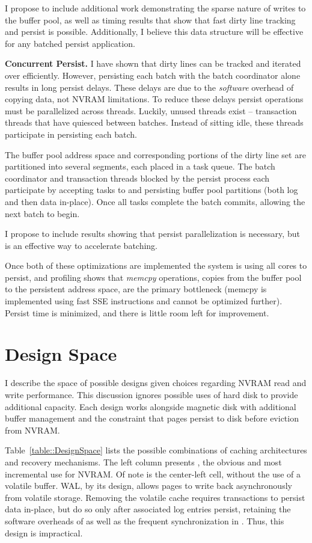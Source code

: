 I propose to include additional work demonstrating the sparse nature of writes to the buffer pool, as well as timing results that show that fast dirty line tracking and persist is possible.
Additionally, I believe this data structure will be effective for any batched persist application.

\textbf{Concurrent Persist.}
I have shown that dirty lines can be tracked and iterated over efficiently.
However, persisting each batch with the batch coordinator alone results in long persist delays.
These delays are due to the \emph{software} overhead of copying data, not NVRAM limitations.
To reduce these delays persist operations must be parallelized across threads.
Luckily, unused threads exist -- transaction threads that have quiesced between batches.
Instead of sitting idle, these threads participate in persisting each batch.

The buffer pool address space and corresponding portions of the dirty line set are partitioned into several segments, each placed in a task queue.
The batch coordinator and transaction threads blocked by the persist process each participate by accepting tasks to and persisting buffer pool partitions (both log and then data in-place).
Once all tasks complete the batch commits, allowing the next batch to begin.

I propose to include results showing that persist parallelization is necessary, but is an effective way to accelerate batching.

Once both of these optimizations are implemented the system is using all cores to persist, and profiling shows that \emph{memcpy} operations, copies from the buffer pool to the persistent address space, are the primary bottleneck (memcpy is implemented using fast SSE instructions and cannot be optimized further).
Persist time is minimized, and there is little room left for improvement.

\section{Design Space}
\label{sec:OLTP_design:Designs}
I describe the space of possible designs given choices regarding NVRAM read and write performance.
This discussion ignores possible uses of hard disk to provide additional capacity.
Each design works alongside magnetic disk with additional buffer management and the constraint that pages persist to disk before eviction from NVRAM.

Table~\ref{table::DesignSpace} lists the possible combinations of caching architectures and recovery mechanisms.
The left column presents \NVDisk, the obvious and most incremental use for NVRAM.
Of note is the center-left cell, \NVDisk without the use of a volatile buffer.
WAL, by its design, allows pages to write back asynchronously from volatile storage.
Removing the volatile cache requires transactions to persist data in-place, but do so only after associated log entries persist, retaining the software overheads of \NVDisk as well as the frequent synchronization in \InPlace.
Thus, this design is impractical.

